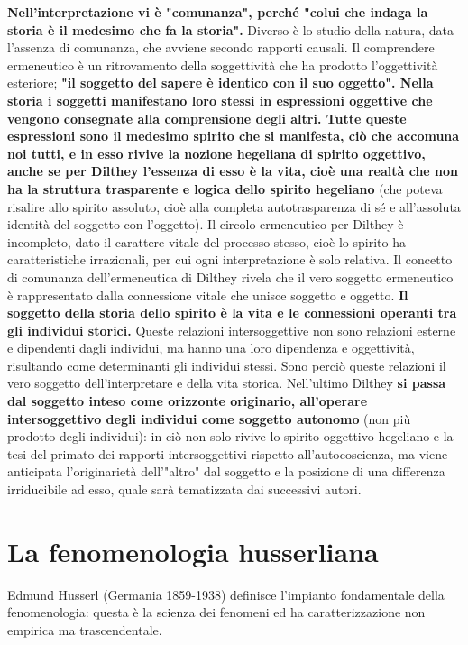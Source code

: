 \textbf{Nell'interpretazione vi è "comunanza", perché "colui che
indaga la storia è il medesimo che fa la storia".}
Diverso è lo studio della natura, data l'assenza
di comunanza, che avviene secondo rapporti causali.
Il comprendere ermeneutico è un ritrovamento della soggettività che ha prodotto l'oggettività
esteriore; \textbf{"il soggetto del sapere è identico con
il suo oggetto".
Nella storia i soggetti manifestano loro stessi in
espressioni oggettive che vengono consegnate alla
comprensione degli altri. Tutte queste espressioni
sono il medesimo spirito che si manifesta, ciò
che accomuna noi tutti, e in esso rivive la nozione
hegeliana di spirito oggettivo, anche se per
Dilthey l'essenza di esso è la vita, cioè una
realtà che non ha la struttura trasparente e logica
dello spirito hegeliano} (che poteva risalire allo spirito
assoluto, cioè alla completa autotrasparenza
di sé e all'assoluta identità del soggetto con
l'oggetto).
Il circolo ermeneutico per Dilthey è incompleto,
dato il carattere vitale del processo stesso, cioè
lo spirito ha caratteristiche irrazionali, per cui ogni
interpretazione è solo relativa.
Il concetto di comunanza dell'ermeneutica di Dilthey
rivela che il vero soggetto ermeneutico è rappresentato
dalla connessione vitale che unisce soggetto e oggetto.
\textbf{Il soggetto della storia dello spirito è
la vita e le connessioni operanti tra gli individui
storici.} Queste relazioni intersoggettive non sono
relazioni esterne e dipendenti dagli individui, ma
hanno una loro dipendenza e oggettività,  risultando
come determinanti gli individui stessi. Sono perciò
queste relazioni il vero soggetto dell'interpretare
e della vita storica. Nell'ultimo Dilthey \textbf{si
passa dal soggetto inteso come orizzonte originario,
all'operare intersoggettivo degli individui
come soggetto autonomo} (non più prodotto degli
individui): in ciò non solo rivive lo spirito
oggettivo hegeliano e la tesi del primato
dei rapporti intersoggettivi rispetto all'autocoscienza, ma viene anticipata
l'originarietà dell'"altro" dal soggetto
e la posizione di una differenza irriducibile
ad esso, quale sarà tematizzata dai successivi
autori.

\section{La fenomenologia husserliana}

Edmund Husserl (Germania 1859-1938) definisce
l'impianto fondamentale della fenomenologia:
questa è la scienza dei fenomeni ed ha
caratterizzazione non empirica ma trascendentale.

